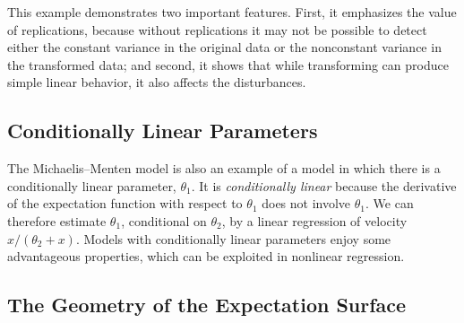 This example demonstrates two important features.
First, it
emphasizes the value of replications, because without
replications it may not be possible to detect either the constant
variance in the original data or the nonconstant variance in the
transformed data; and second, it shows that while transforming
can produce simple linear behavior, it also
affects the disturbances.
\subsection{Conditionally Linear Parameters}

The Michaelis--Menten model is also an example of a model in which
there is a conditionally linear parameter, $\theta_1$.
It is {\it conditionally linear} because the
derivative of the expectation function with respect to
$\theta_1$ does not involve $\theta_1$.
We can therefore estimate $\theta_1$, conditional on $\theta_2$, by a
linear regression of velocity $x/(\theta_2+x)$.
Models with conditionally linear parameters enjoy some advantageous
properties, which can be exploited in nonlinear regression.

\subsection{The Geometry of the Expectation Surface}

